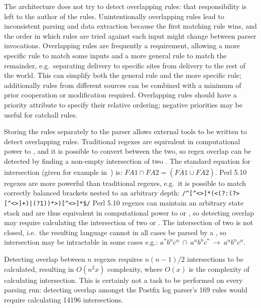 \documentclass{svmult}
\newcommand{\tab}[0]{%
    \hspace*{2em}%
}
\newcommand{\numberOFrules}[0]{%
    169%
}
\newcommand{\numberOFruleINTERSECTIONS}[0]{%
    14196%
}
\begin{document}
The architecture does not try to detect overlapping rules: that
responsibility is left to the author of the rules.  Unintentionally
overlapping rules lead to inconsistent parsing and data extraction because
the first matching rule wins, and the order in which rules are tried
against each input might change between parser invocations.  Overlapping
rules are frequently a requirement, allowing a more specific rule to match
some inputs and a more general rule to match the remainder, e.g.\
separating \SMTP{} delivery to specific sites from \SMTP{} delivery to the
rest of the world.  This can simplify both the general rule and the more
specific rule; additionally rules from different sources can be combined
with a minimum of prior cooperation or modification required.  Overlapping
rules should have a priority attribute to specify their relative ordering;
negative priorities may be useful for catchall rules.

Storing the rules separately to the parser allows external tools to be
written to detect overlapping rules.  Traditional regexes are equivalent in
computational power to \FA{}, and it is possible to convert between the
two, so regex overlap can be detected by finding a non-empty intersection
of two \FA{}\@.  The standard equation for \FA{} intersection (given for
example in~\cite{intersection-of-NFA-using-Z}) is: $FA1 \cap{} FA2 =
\overline{(\overline{FA1} \cup{} \overline{FA2})}$.  Perl 5.10 regexes are
more powerful than traditional regexes, e.g.\ it is possible to match
correctly balanced brackets nested to an arbitrary depth:
\newline{}\tab{}\verb!/^[^<>]*(<(?:(?>[^<>]+)|(?1))*>)[^<>]*$/!\newline{}
Perl 5.10 regexes can maintain an arbitrary state stack and are thus
equivalent in computational power to \PDA{} or \CFL{}, so detecting overlap
may require calculating the intersection of two \PDA{} or \CFL{}\@.  The
intersection of two \CFL{} is not closed, i.e.\ the resulting language
cannot in all cases be parsed by a \CFL{}, so intersection may be
intractable in some cases e.g.:
$a^{*}b^{n}c^{n}~\cap~a^{n}b^{n}c^{*}~\rightarrow~a^{n}b^{n}c^{n}$.

Detecting overlap between $n$ regexes requires $n(n-1)/2$ intersections to
be calculated, resulting in $O(n^2x)$ complexity, where $O(x)$ is the
complexity of calculating intersection.  This is certainly not a task to be
performed on every parsing run: detecting overlap amongst the Postfix log
parser's \numberOFrules{} rules would require calculating
\numberOFruleINTERSECTIONS{} intersections.
\end{document}
